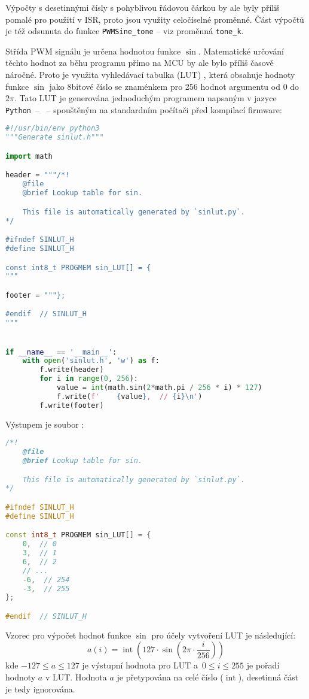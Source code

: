 Výpočty s desetinnými čísly s pohyblivou řádovou čárkou by ale byly příliš
pomalé pro použití v ISR, proto jsou využity celočíselné proměnné. Část
výpočtů je též odsunuta do funkce \verb|PWMSine_tone| -- viz proměnná
\verb|tone_k|.

Střída PWM signálu je určena hodnotou funkce $\sin$. Matematické určování
těchto hodnot za běhu programu přímo na MCU by ale bylo příliš časově náročné.
Proto je využita vyhledávací tabulka (LUT) , která obsahuje
hodnoty funkce $\sin$ jako 8bitové číslo se znaménkem pro 256 hodnot argumentu
od $0$ do $2\pi$. Tato LUT je generována jednoduchým programem napsaným
v jazyce \texttt{Python}~-- ~-- spouštěným na standardním
počítači před kompilací firmware:
\begin{lstlisting}[language=Python,style=numbers]
#!/usr/bin/env python3
"""Generate sinlut.h"""

import math

header = """/*!
    @file
    @brief Lookup table for sin.

    This file is automatically generated by `sinlut.py`.
*/

#ifndef SINLUT_H
#define SINLUT_H

const int8_t PROGMEM sin_LUT[] = {
"""

footer = """};

#endif  // SINLUT_H
"""


if __name__ == '__main__':
    with open('sinlut.h', 'w') as f:
        f.write(header)
        for i in range(0, 256):
            value = int(math.sin(2*math.pi / 256 * i) * 127)
            f.write(f'    {value},  // {i}\n')
        f.write(footer)
\end{lstlisting}

Výstupem je soubor :
\begin{lstlisting}[language=C++,style=numbers]
/*!
    @file
    @brief Lookup table for sin.

    This file is automatically generated by `sinlut.py`.
*/

#ifndef SINLUT_H
#define SINLUT_H

const int8_t PROGMEM sin_LUT[] = {
    0,  // 0
    3,  // 1
    6,  // 2
    // ...
    -6,  // 254
    -3,  // 255
};

#endif  // SINLUT_H
\end{lstlisting}

Vzorec pro výpočet hodnot funkce $\sin$ pro účely vytvoření LUT je následující:
\begin{equation}
    a(i) = \operatorname{int}\left( \num{127}\cdot\sin{\left(2\pi \cdot \frac{i}{256}\right)} \right)
\end{equation}
kde $\num{-127} \le a \le \num{127}$ je výstupní hodnota pro LUT
a~$\num{0} \le i \le \num{255}$ je pořadí hodnoty $a$ v LUT. Hodnota $a$ je
přetypována na celé číslo ($\operatorname{int}$), desetinná část je tedy
ignorována.

